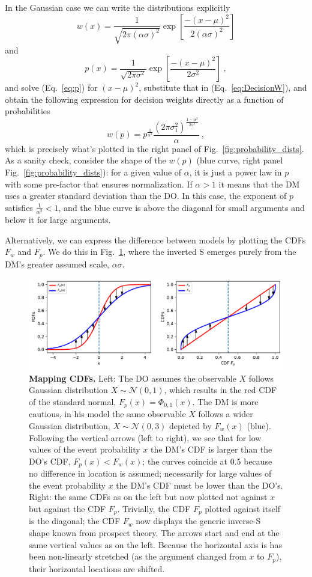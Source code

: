 \documentclass[a4paper, 12pt]{article}
\newcommand{\elabel}[1]{\label{eq:#1}}
\newcommand{\eref}[1]{(Eq.~\ref{eq:#1})}
\newcommand{\flabel}[1]{\label{fig:#1}}
\newcommand{\fref}[1]{Fig.~\ref{fig:#1}}
\newcommand{\be}{\begin{equation}}
\newcommand{\ee}{\end{equation}}
\newcommand{\ND}{\mathcal{N}} %
\begin{document}
In the Gaussian case we can write the distributions explicitly
\be \elabel{DecisionW}
	w(x)=\frac{1}{\sqrt{2\pi (\alpha \sigma)^2}}\exp\left[\frac{-(x -\mu )^2}{2 (\alpha \sigma)^2}\right]
\ee
and
\be
	p(x)=\frac{1}{\sqrt{2\pi \sigma^2}}\exp\left[\frac{-(x -\mu )^2}{2 \sigma^2}\right] ~,
\elabel{p}
\ee
% 
and solve \eref{p} for $(x -\mu)^2$, substitute that in \eref{DecisionW}, and obtain the following expression for decision weights directly as a function of probabilities
\be
w(p)= p^{\frac{1}{\alpha^2}} \frac{\left(2\pi\sigma_1^2\right)^{\frac{1-\alpha^2}{2\alpha^2}}}{\alpha} ~,
\elabel{w_of_p}
\ee
which is precisely what's plotted in the right panel of \fref{probability_dists}. As a sanity check, consider the shape of the $w(p)$ (blue curve, right panel \fref{probability_dists}): for a given value of $\alpha$, it is just a power law in $p$ with some pre-factor that ensures normalization. If $\alpha>1$ it means that the DM uses a greater standard deviation than the DO. In this case, the exponent of $p$ satisfies $\frac{1}{\alpha^2}<1$, and the blue curve is above the diagonal for small arguments and below it for large arguments.

Alternatively, we can express the difference between models by plotting the CDFs $F_w$ and $F_p$. We do this in \fref{TwoCDFs}, where the inverted S emerges purely from the DM's greater assumed scale, $\alpha \sigma$.

\begin{figure}[!htb]
\centering
\includegraphics[width=\textwidth]{./figs/GaussianFvsXtoWvsP.pdf}
\caption{{\bf Mapping CDFs.} 
Left: The DO assumes the observable $X$ follows Gaussian distribution $X \sim \ND(0,1)$, which results in the red CDF of the standard normal, $F_p(x) = \Phi_{0,1}(x)$. The DM is more cautious, in his model the same observable $X$ follows a wider Gaussian distribution, $X \sim \ND(0,3)$ depicted by $F_w(x)$ (blue). 
% 
Following the vertical arrows (left to right), we see that for low values of the event probability $x$ the DM's CDF is larger than the DO's CDF, $F_p(x) < F_w(x)$; the curves coincide at 0.5 because no difference in location is assumed; necessarily for large values of the event probability $x$ the DM's CDF must be lower than the DO's.
Right: the same CDFs as on the left but now plotted not against $x$ but against the CDF $F_p$. Trivially, the CDF $F_p$ plotted against itself is the diagonal; the CDF $F_w$ now displays the generic inverse-S shape known from prospect theory. The arrows start and end at the same vertical values as on the left. Because the horizontal axis is has been non-linearly stretched (as the argument changed from $x$ to $F_p$), their horizontal locations are shifted.
}
\flabel{TwoCDFs}
\end{figure}
\end{document}
